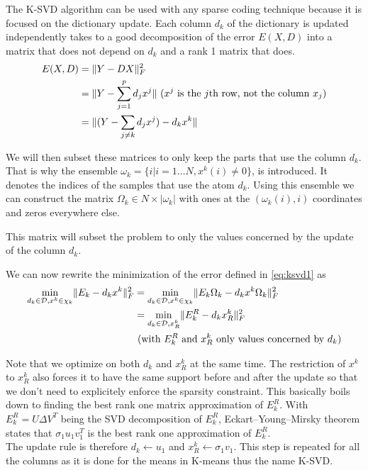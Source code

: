 \documentclass[a4paper,11pt]{article}
\DeclarePairedDelimiter\norm{\lVert}{\rVert} %
\begin{document}
The K-SVD algorithm can be used with any sparse coding technique because it is focused on the dictionary update.
Each column $d_k$ of the dictionary is updated independently takes to a good decomposition of the error $E(X,D)$ into a matrix that does not depend on $d_k$ and a rank 1 matrix that does.
\begin{equation} \label{eq:ksvd1}
\begin{split}
  E(X,D) & = \norm{Y - DX}_F^2 \\
  		 & = \norm{Y - \sum\limits_{j=1}^{p} d_j x^j} \text{ ($x^j$ is the $j$th row, not the column $x_j$)}\\
         & = \norm{(Y - \sum\limits_{j \neq k} d_j x^j)  - d_k x^k}
\end{split}
\end{equation}

We will then subset these matrices to only keep the parts that use the column $d_k$.
That is why the ensemble $\omega_k = \{i | i = 1 \ldots N, x^k(i) \neq 0\}$, is introduced. It denotes the indices of the samples that use the atom $d_k$.
Using this ensemble we can construct the matrix $\Omega_k \in N \times |\omega_k|$ with ones at the $(\omega_k(i),i)$ coordinates and zeros everywhere else.

This matrix will subset the problem to only the values concerned by the update of the column $d_k$.

We can now rewrite the minimization of the error defined in \ref{eq:ksvd1} as
\begin{equation*}
\begin{split}
  \min_{d_k \in \mathcal{D}, x^k \in \chi_k} \norm{E_k - d_k x^k }_F^2 & = \min_{d_k \in \mathcal{D}, x^k \in \chi_k} \norm{E_k \Omega_k - d_k x^k \Omega_k}_F^2 \\
  											& = \min_{d_k \in \mathcal{D}, x^k_R} \norm{E_k^R - d_k x^k_R}_F^2 \\
                                            & \text{ (with $E_k^R$ and $x^k_R$ only values concerned by $d_k$)}
\end{split}
\end{equation*}

Note that we optimize on both $d_k$ and $x^k_R$ at the same time. The restriction of $x^k$ to $x^k_R$ also forces it to have the same support before and after the update so that we don't need to explicitely enforce the sparsity constraint.
This basically boils down to finding the best rank one matrix approximation of $E_k^R$.
With $E_k^R = U \Delta V^T$ being the SVD decomposition of $E_k^R$, Eckart–Young–Mirsky theorem states that $\sigma_1 u_1 v_1^T$ is the best rank one approximation of $E_k^R$.\\
The update rule is therefore $d_k \leftarrow u_1$ and $x^k_R \leftarrow \sigma_1 v_1$.
This step is repeated for all the columns as it is done for the means in K-means thus the name K-SVD.
\end{document}
